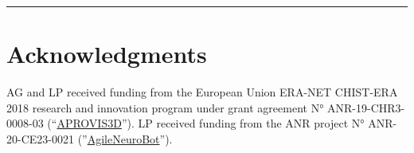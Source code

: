 \documentclass[landscape,a0]{a0poster}
\newcommand{\Acknowledgments}{AG and LP received funding from the European Union ERA-NET CHIST-ERA 2018 research and innovation program under grant agreement N° ANR-19-CHR3-0008-03 (``\href{http://aprovis3d.eu/}{APROVIS3D}''). LP received funding from the ANR project  N° ANR-20-CE23-0021 (''\href{https://laurentperrinet.github.io/grant/anr-anr/}{AgileNeuroBot}''). %
}
\begin{document}
\begin{multicols}{3}
%
\vspace{1cm}
\hrule
\printbibliography
\section*{Acknowledgments}
\vspace{-1cm}
\Acknowledgments
%
\end{multicols}
%
\end{document}
